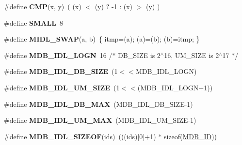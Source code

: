 \begin{DoxyCompactItemize}
\item 
\mbox{\label{group__idls_gafb073915b50e7112cfed534aff6524cf}} 
\#define {\bfseries C\+MP}(x,  y)~( (x) $<$ (y) ? -\/1 \+: (x) $>$ (y) )
\item 
\mbox{\label{group__idls_ga09c78d2f8feb311dd9fc969a0bf84979}} 
\#define {\bfseries S\+M\+A\+LL}~8
\item 
\mbox{\label{group__idls_ga3ba85d6201d0518626404096ed0c08a9}} 
\#define {\bfseries M\+I\+D\+L\+\_\+\+S\+W\+AP}(a,  b)~\{ itmp=(a); (a)=(b); (b)=itmp; \}
\item 
\mbox{\label{group__idls_ga5913db46baa9f4c150fd306ed60c5df2}} 
\#define {\bfseries M\+D\+B\+\_\+\+I\+D\+L\+\_\+\+L\+O\+GN}~16	/$\ast$ D\+B\+\_\+\+S\+I\+ZE is 2$^\wedge$16, U\+M\+\_\+\+S\+I\+ZE is 2$^\wedge$17 $\ast$/
\item 
\mbox{\label{group__idls_gaa45bf227dabe81a33a3d010ec5837d53}} 
\#define {\bfseries M\+D\+B\+\_\+\+I\+D\+L\+\_\+\+D\+B\+\_\+\+S\+I\+ZE}~(1$<$$<$M\+D\+B\+\_\+\+I\+D\+L\+\_\+\+L\+O\+GN)
\item 
\mbox{\label{group__idls_gaeba3deef11f846a3d92e00dc2e09403d}} 
\#define {\bfseries M\+D\+B\+\_\+\+I\+D\+L\+\_\+\+U\+M\+\_\+\+S\+I\+ZE}~(1$<$$<$(M\+D\+B\+\_\+\+I\+D\+L\+\_\+\+L\+O\+GN+1))
\item 
\mbox{\label{group__idls_ga4b58903bea2b843d866f5c8fd1a9aaf7}} 
\#define {\bfseries M\+D\+B\+\_\+\+I\+D\+L\+\_\+\+D\+B\+\_\+\+M\+AX}~(M\+D\+B\+\_\+\+I\+D\+L\+\_\+\+D\+B\+\_\+\+S\+I\+ZE-\/1)
\item 
\mbox{\label{group__idls_ga329af3b2c499bf05f3f1f96f24645ab5}} 
\#define {\bfseries M\+D\+B\+\_\+\+I\+D\+L\+\_\+\+U\+M\+\_\+\+M\+AX}~(M\+D\+B\+\_\+\+I\+D\+L\+\_\+\+U\+M\+\_\+\+S\+I\+ZE-\/1)
\item 
\mbox{\label{group__idls_ga27cf9b6582a14b526efacb0103479af2}} 
\#define {\bfseries M\+D\+B\+\_\+\+I\+D\+L\+\_\+\+S\+I\+Z\+E\+OF}(ids)~(((ids)\mbox{[}0\mbox{]}+1) $\ast$ sizeof(\mbox{\hyperlink{group__idls_ga792192229a977c49f083846b5635f92d}{M\+D\+B\+\_\+\+ID}}))

\end{DoxyCompactItemize}
